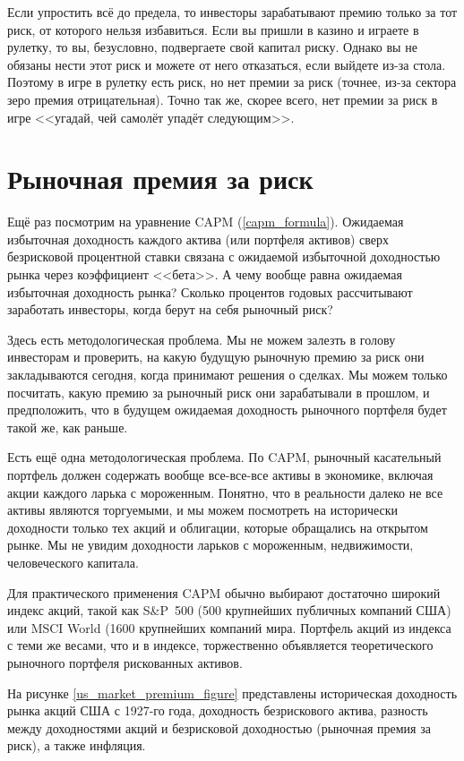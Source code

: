 Если упростить всё до предела, то инвесторы зарабатывают премию только за тот риск, от которого нельзя избавиться. Если вы пришли в казино и играете в рулетку, то вы, безусловно, подвергаете свой капитал риску. Однако вы не обязаны нести этот риск и можете от него отказаться, если выйдете из-за стола. Поэтому в игре в рулетку есть риск, но нет премии за риск (точнее, из-за сектора зеро премия отрицательная). Точно так же, скорее всего, нет премии за риск в игре <<угадай, чей самолёт упадёт следующим>>.

\section{Рыночная премия за риск}

Ещё раз посмотрим на уравнение CAPM (\ref{capm_formula}). Ожидаемая избыточная доходность каждого актива (или портфеля активов) сверх безрисковой процентной ставки связана с ожидаемой избыточной доходностью рынка через коэффициент <<бета>>. А чему вообще равна ожидаемая избыточная доходность рынка? Сколько процентов годовых рассчитывают заработать инвесторы, когда берут на себя рыночный риск?

Здесь есть методологическая проблема. Мы не можем залезть в голову инвесторам и проверить, на какую будущую рыночную премию за риск они закладываются сегодня, когда принимают решения о сделках. Мы можем только посчитать, какую премию за рыночный риск они зарабатывали в прошлом, и предположить, что в будущем ожидаемая доходность рыночного портфеля будет такой же, как раньше.

Есть ещё одна методологическая проблема. По CAPM, рыночный касательный портфель должен содержать вообще все-все-все активы в экономике, включая акции каждого ларька с мороженным. Понятно, что в реальности далеко не все активы являются торгуемыми, и мы можем посмотреть на исторически доходности только тех акций и облигации, которые обращались на открытом рынке. Мы не увидим доходности ларьков с мороженным, недвижимости, человеческого капитала.

Для практического применения CAPM обычно выбирают достаточно широкий индекс акций, такой как S\&P~500 (500 крупнейших публичных компаний США) или MSCI World (1600 крупнейших компаний мира. Портфель акций из индекса с теми же весами, что и в индексе, торжественно объявляется  теоретического рыночного портфеля рискованных активов.

На рисунке \ref{us_market_premium_figure} представлены историческая доходность рынка акций США с 1927-го года, доходность безрискового актива, разность между доходностями акций и безрисковой доходностью (рыночная премия за риск), а также инфляция.

